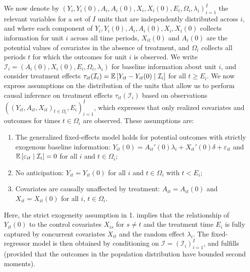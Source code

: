 \documentclass[english,11pt]{article}
\theoremstyle{plain}
\theoremstyle{plain}
\theoremstyle{plain}
\theoremstyle{plain}
\let\ref\Cref
\begin{document}
We now denote by $(Y_{i},Y_{i}(0),A_{i},A_{i}(0),X_{i},X_{i}(0),E_{i},\Omega_{i},\lambda_{i})_{i=1}^{I}$
the relevant variables for a set of $I$ units that are independently
distributed across $i$, and where each component of $Y_{i},Y_{i}(0),A_{i},A_{i}(0),\allowbreak X_{i},X_{i}(0)$
collects information for unit $i$ across all time periods, $X_{it}(0)$
and $A_{i}(0)$ are the potential values of covariates in the absence
of treatment, and $\Omega_{i}$ collects all periods $t$ for which
the outcomes for unit $i$ is observed. We write $\mathcal{I}_{i}=\left(A_{i}(0),X_{i}(0),E_{i},\Omega_{i},\lambda_{i}\right)$
for baseline information about unit $i$, and consider treatment effects
$\tau_{it}(\mathcal{I}_{i})=\mathbb{E}\left[Y_{it}-Y_{it}(0)\mid\mathcal{I}_{i}\right]$
for all $t\geq E_{i}$. We now express assumptions on the distribution
of the units that allow us to perform causal inference on treatment
effects $\tau_{it}(\mathcal{I}_{i})$ based on observations $((Y_{it},A_{it},X_{it})_{t\in\Omega_{i}},E_{i})_{i=1}^{I}$,
which expresses that only realized covariates and outcomes for times
$t\in\Omega_{i}$ are observed. These assumptions are:
\begin{enumerate}
\item The generalized fixed-effects model holds for potential outcomes with
strictly exogenous baseline information: $Y_{it}(0)=A_{it}'(0)\lambda_{i}+X_{it}'(0)\delta+\varepsilon_{it}$
and $\mathbb{E}\left[\varepsilon_{it}\mid\mathcal{I}_{i}\right]=0$ for all $i$
and $t\in\Omega_{i}$;
\item No anticipation: $Y_{it}=Y_{it}(0)$ for all $i$ and $t\in\Omega_{i}$
with $t<E_{i}$;
\item Covariates are causally unaffected by treatment: $A_{it}{=}A_{it}(0)$
and $X_{it}{=}X_{it}(0)$ for all $i$, $t\in\Omega_{i}$.
\end{enumerate}
Here, the strict exogeneity assumption in 1. implies that the relationship
of $Y_{it}(0)$ to the control covariates $X_{is}$ for $s\neq t$
and the treatment time $E_{i}$ is fully captured by concurrent covariates
$X_{it}$ and the random effect $\lambda_{i}$. The fixed-regressor
model is then obtained by conditioning on $\mathcal{I}=(\mathcal{I}_{i})_{i=1}^{I}$,
and fulfills \ref{assu:A1prime,assu:A2,assu:clustered} (provided
that the outcomes in the population distribution have bounded second
moments).
\end{document}
